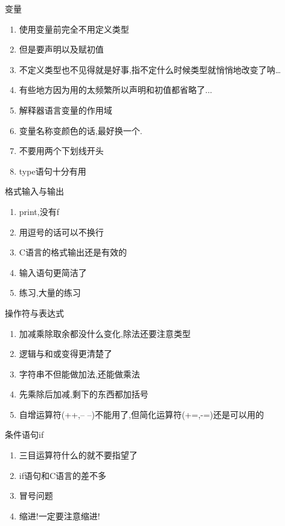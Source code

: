 \documentclass{beamer}
\begin{document}
\begin{frame}{变量}

\begin{enumerate}
\item 使用变量前完全不用定义类型
\item 但是要声明以及赋初值
\item 不定义类型也不见得就是好事,指不定什么时候类型就悄悄地改变了呐\dots
\item 有些地方因为用的太频繁所以声明和初值都省略了...
\item 解释器语言变量的作用域
\item 变量名称变颜色的话,最好换一个.
\item 不要用两个下划线开头
\item type语句十分有用

\end{enumerate}
\end{frame}

\begin{frame}{格式输入与输出}
\begin{enumerate}
\item print,没有f
\item 用逗号的话可以不换行
\item C语言的格式输出还是有效的
\item 输入语句更简洁了
\item 练习,大量的练习

\end{enumerate}
\end{frame}


\begin{frame}{操作符与表达式}
\begin{enumerate}
\item 加减乘除取余都没什么变化,除法还要注意类型
\item 逻辑与和或变得更清楚了
\item 字符串不但能做加法,还能做乘法
\item 先乘除后加减,剩下的东西都加括号
\item 自增运算符(++,-- --)不能用了,但简化运算符(+=,-=)还是可以用的

\end{enumerate}
\end{frame}

\begin{frame}{条件语句if}
\begin{enumerate}
\item 三目运算符什么的就不要指望了
\item if语句和C语言的差不多
\item 冒号问题
\item 缩进!一定要注意缩进!

\end{enumerate}
\end{frame}
\end{document}
